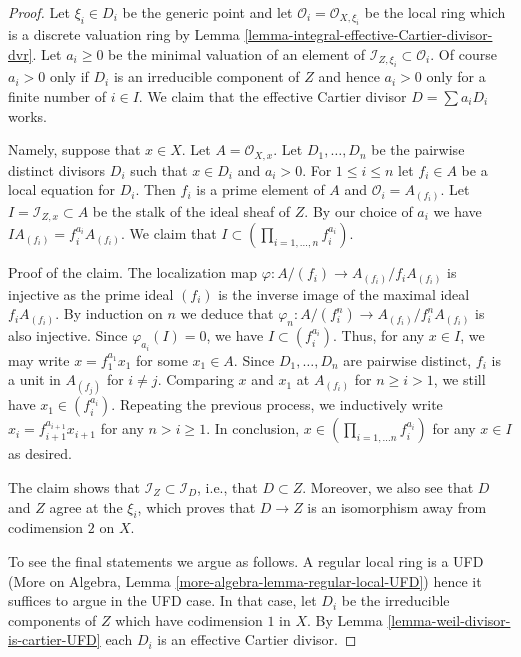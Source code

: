 \begin{proof}
Let $\xi_i \in D_i$ be the generic point and let
$\mathcal{O}_i = \mathcal{O}_{X, \xi_i}$ be the local ring
which is a discrete valuation ring by
Lemma \ref{lemma-integral-effective-Cartier-divisor-dvr}.
Let $a_i \geq 0$ be the minimal valuation of an element of
$\mathcal{I}_{Z, \xi_i} \subset \mathcal{O}_i$.
Of course $a_i > 0$ only if $D_i$ is an irreducible component
of $Z$ and hence $a_i > 0$ only for a finite number of $i \in I$.
We claim that the effective Cartier divisor $D = \sum a_i D_i$ works.

\medskip\noindent
Namely, suppose that $x \in X$. Let $A = \mathcal{O}_{X, x}$.
Let $D_1, \ldots, D_n$ be the pairwise distinct divisors
$D_i$ such that $x \in D_i$ and $a_i > 0$.
For $1 \leq i \leq n$ let $f_i \in A$ be a local equation for $D_i$.
Then $f_i$ is a prime element of $A$ and $\mathcal{O}_i = A_{(f_i)}$. Let
$I = \mathcal{I}_{Z, x} \subset A$ be the stalk of the
ideal sheaf of $Z$. By our choice of $a_i$ we have
$I A_{(f_i)} = f_i^{a_i}A_{(f_i)}$. We claim that
$I \subset (\prod_{i = 1, \ldots, n} f_i^{a_i})$.

\medskip\noindent
Proof of the claim. The localization map
$\varphi : A/(f_i) \to A_{(f_i)}/f_iA_{(f_i)}$ is injective as
the prime ideal $(f_i)$ is the inverse image of the maximal ideal
$f_iA_{(f_i)}$. By induction on $n$ we deduce that
$\varphi_n : A/(f_i^n)\to A_{(f_i)}/f_i^nA_{(f_i)}$ is also injective.
Since $\varphi_{a_i}(I) = 0$, we have $I \subset (f_i^{a_i})$.
Thus, for any $x \in I$, we may write $x = f_1^{a_1}x_1$
for some $x_1 \in A$. Since $D_1, \ldots, D_n$ are pairwise
distinct, $f_i$ is a unit in $A_{(f_j)}$ for $i \not = j$.
Comparing $x$ and $x_1$ at $A_{(f_i)}$
for $n \geq i > 1$, we still have $x_1 \in (f_i^{a_i})$.
Repeating the previous process, we inductively write
$x_i = f_{i + 1}^{a_{i + 1}}x_{i + 1}$ for any $n > i \geq 1$.
In conclusion, $x \in (\prod_{i = 1, \ldots n} f_i^{a_i})$
for any $x \in I$ as desired.

\medskip\noindent
The claim shows that $\mathcal{I}_Z \subset \mathcal{I}_D$, i.e., that
$D \subset Z$. Moreover, we also see that $D$ and $Z$ agree at the $\xi_i$,
which proves that $D \to Z$ is an isomorphism away from codimension $2$ on $X$.

\medskip\noindent
To see the final statements we argue as follows. A regular local
ring is a UFD (More on Algebra, Lemma
\ref{more-algebra-lemma-regular-local-UFD}) hence it suffices
to argue in the UFD case. In that case, let
$D_i$ be the irreducible components of $Z$
which have codimension $1$ in $X$.
By Lemma \ref{lemma-weil-divisor-is-cartier-UFD} each $D_i$
is an effective Cartier divisor.
\end{proof}

